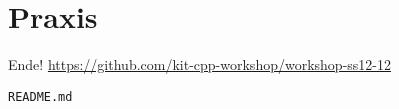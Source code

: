 \section{Praxis}
\begin{frame}[fragile]{Ende!}
	\large{\url{https://github.com/kit-cpp-workshop/workshop-ss12-12}}
	
	\vspace{1em}
	
	\begin{center}
		\verb|README.md|
	\end{center}

\end{frame}
